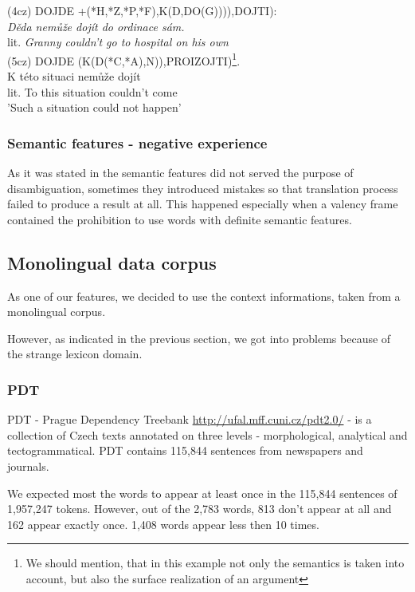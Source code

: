 \documentclass[letterpaper]{article}
\begin{document}
(4cz) DOJDE +(*H,*Z,*P,*F),K(D,DO(G)))),DOJTI):\\
\textit{Děda nemůže dojít do ordinace sám.}\\
lit. \textit{Granny couldn't go to hospital on his own}\\

(5cz) DOJDE (K(D(*C,*A),N)),PROIZOJTI)\footnote{We should mention, that in this example
not only the semantics is taken into account, but also the surface realization of an argument}.\\
K této situaci nemůže dojít\\
lit. To this situation couldn't come\\
'Such a situation could not happen'

\subsubsection{Semantic features - negative experience}
As it was stated in \cite{KubonPHD2001} the semantic features did not
served the purpose of disambiguation, sometimes they introduced mistakes
so that translation process failed to produce a result at all. This
happened especially when a valency frame contained the prohibition
to use words with definite semantic features.



\subsection{Monolingual data corpus}
As one of our features, we decided to use the context informations, taken from a monolingual corpus.

However, as indicated in the previous section, we got into problems because of the strange lexicon domain.
\subsubsection{PDT}
PDT - Prague Dependency Treebank \url{http://ufal.mff.cuni.cz/pdt2.0/} - is a collection of Czech texts annotated on three
levels - morphological, analytical and tectogrammatical.   
PDT contains 115,844 sentences from newspapers and journals.

We expected most the words to appear at least once in the 115,844 sentences of 1,957,247 tokens. 
However, out of the 2,783 words, 813 don't appear at all and 162 appear exactly once. 
1,408 words appear less then 10 times.
\end{document}
